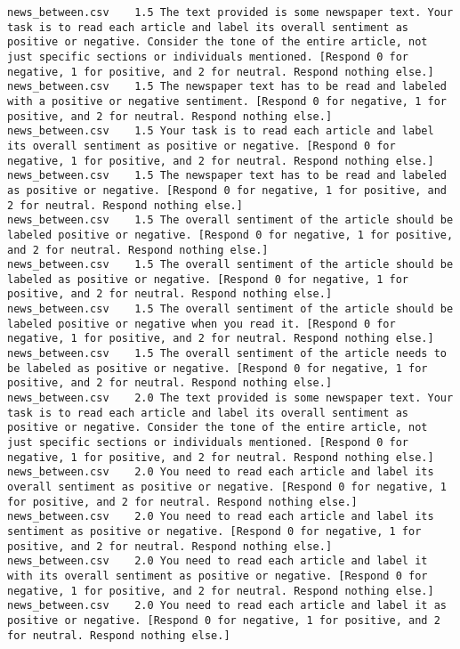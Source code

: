 \begin{lstlisting}
news_between.csv	1.5	The text provided is some newspaper text. Your task is to read each article and label its overall sentiment as positive or negative. Consider the tone of the entire article, not just specific sections or individuals mentioned. [Respond 0 for negative, 1 for positive, and 2 for neutral. Respond nothing else.]
news_between.csv	1.5	The newspaper text has to be read and labeled with a positive or negative sentiment. [Respond 0 for negative, 1 for positive, and 2 for neutral. Respond nothing else.]
news_between.csv	1.5	Your task is to read each article and label its overall sentiment as positive or negative. [Respond 0 for negative, 1 for positive, and 2 for neutral. Respond nothing else.]
news_between.csv	1.5	The newspaper text has to be read and labeled as positive or negative. [Respond 0 for negative, 1 for positive, and 2 for neutral. Respond nothing else.]
news_between.csv	1.5	The overall sentiment of the article should be labeled positive or negative. [Respond 0 for negative, 1 for positive, and 2 for neutral. Respond nothing else.]
news_between.csv	1.5	The overall sentiment of the article should be labeled as positive or negative. [Respond 0 for negative, 1 for positive, and 2 for neutral. Respond nothing else.]
news_between.csv	1.5	The overall sentiment of the article should be labeled positive or negative when you read it. [Respond 0 for negative, 1 for positive, and 2 for neutral. Respond nothing else.]
news_between.csv	1.5	The overall sentiment of the article needs to be labeled as positive or negative. [Respond 0 for negative, 1 for positive, and 2 for neutral. Respond nothing else.]
news_between.csv	2.0	The text provided is some newspaper text. Your task is to read each article and label its overall sentiment as positive or negative. Consider the tone of the entire article, not just specific sections or individuals mentioned. [Respond 0 for negative, 1 for positive, and 2 for neutral. Respond nothing else.]
news_between.csv	2.0	You need to read each article and label its overall sentiment as positive or negative. [Respond 0 for negative, 1 for positive, and 2 for neutral. Respond nothing else.]
news_between.csv	2.0	You need to read each article and label its sentiment as positive or negative. [Respond 0 for negative, 1 for positive, and 2 for neutral. Respond nothing else.]
news_between.csv	2.0	You need to read each article and label it with its overall sentiment as positive or negative. [Respond 0 for negative, 1 for positive, and 2 for neutral. Respond nothing else.]
news_between.csv	2.0	You need to read each article and label it as positive or negative. [Respond 0 for negative, 1 for positive, and 2 for neutral. Respond nothing else.]

\end{lstlisting}
